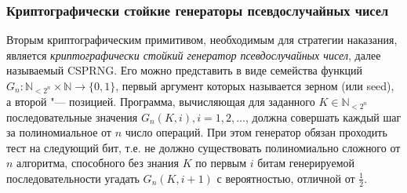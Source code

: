 \begin{frame}
	\frametitle{Криптографически стойкие генераторы псевдослучайных чисел}
	Вторым криптографическим примитивом, необходимым для стратегии наказания, является \emph{криптографически стойкий генератор псевдослучайных чисел}, далее называемый CSPRNG. Его можно представить в виде семейства функций $G_n : \mathbb{N}_{<2^n} \times \mathbb{N} \rightarrow \{0, 1\}$, первый аргумент которых называется зерном (или seed), а второй "--- позицией. Программа, вычисляющая для заданного $K \in \mathbb{N}_{<2^n}$ последовательные значения $G_n(K, i), i = 1, 2, \ldots$, должна совершать каждый шаг за полиномиальное от $n$ число операций. При этом генератор обязан проходить тест на следующий бит, т.е. не должно существовать полиномиально сложного от $n$ алгоритма, способного без знания $K$ по первым $i$ битам генерируемой последовательности угадать $G_n(K, i+1)$ с вероятностью, отличной от $\frac{1}{2}$.
\end{frame}

